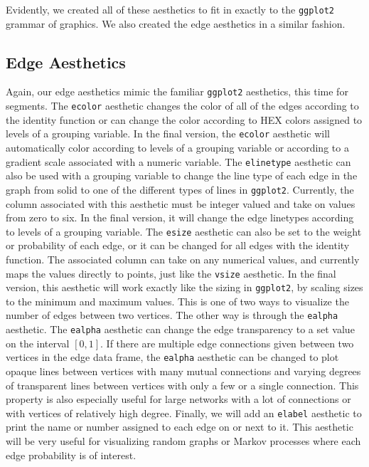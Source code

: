 \documentclass[11pt]{article}\usepackage[]{graphicx}\usepackage[]{color}
\begin{document}
\par Evidently, we created all of these aesthetics to fit in exactly to the \texttt{ggplot2} grammar of graphics. We also created the edge aesthetics in a similar fashion.
  \subsection{Edge Aesthetics}
  Again, our edge aesthetics mimic the familiar \texttt{ggplot2} aesthetics, this time for segments.    The \texttt{ecolor} aesthetic changes the color of all of the edges according to the identity function or can change the color according to HEX colors assigned to levels of a grouping variable.  In the final version, the \texttt{ecolor} aesthetic will automatically color according to levels of a grouping variable or according to a gradient scale associated with a numeric variable.
  The \texttt{elinetype} aesthetic can also be used with a grouping variable to change the line type of each edge in the graph from solid to one of the different types of lines in \texttt{ggplot2}. Currently, the column associated with this aesthetic must be integer valued and take on values from zero to six. In the final version, it will change the edge linetypes according to levels of a grouping variable.  The \texttt{esize} aesthetic can also be set to the weight or probability of each edge, or it can be changed for all edges with the identity function. The associated column can take on any numerical values, and currently maps the values directly to points, just like the \texttt{vsize} aesthetic. In the final version, this aesthetic will work exactly like the sizing in \texttt{ggplot2}, by scaling sizes to the minimum and maximum values. This is one of two ways to visualize the number of edges between two vertices.  The other way is through the \texttt{ealpha} aesthetic. The \texttt{ealpha} aesthetic can change the edge transparency to a set value on the interval $[0,1]$.  If there are multiple edge connections given between two vertices in the edge data frame, the \texttt{ealpha} aesthetic can be changed to plot opaque lines between vertices with many mutual connections and varying degrees of transparent lines between vertices with only a few or a single connection. This property is also especially useful for large networks with a lot of connections or with vertices of relatively high degree. Finally, we will add an \texttt{elabel} aesthetic to print the name or number assigned to each edge on or next to it.  This aesthetic will be very useful for visualizing random graphs or Markov processes where each edge probability is of interest.
\end{document}
